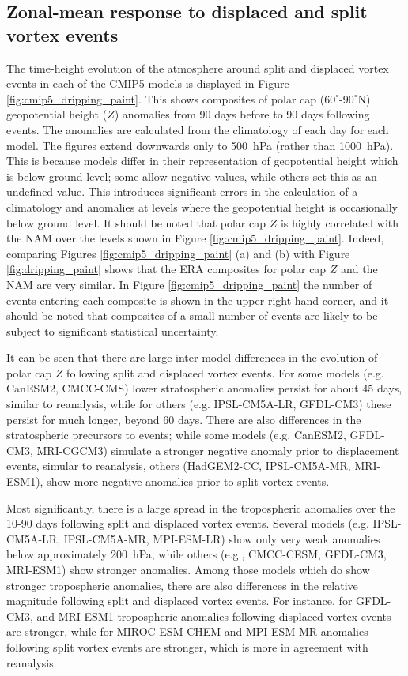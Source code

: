 \subsection{Zonal-mean response to displaced and split vortex events}

The time-height evolution of the atmosphere around split and displaced vortex
events in each of the CMIP5 models is displayed in Figure
\ref{fig:cmip5_dripping_paint}. This shows composites of polar cap
($60^{\circ}$-$90^{\circ}$N) geopotential height ($Z$) anomalies from 90 days
before to 90 days following events. The anomalies are calculated from the
climatology of each day for each model. The figures extend downwards only to
500~hPa (rather than 1000~hPa). This is because models differ in their
representation of geopotential height which is below ground level; some allow
negative values, while others set this as an undefined value. This introduces
significant errors in the calculation of a climatology and anomalies at levels
where the geopotential height is occasionally below ground level. It should be
noted that polar cap $Z$ is highly correlated with the NAM over the levels shown
in Figure \ref{fig:cmip5_dripping_paint}. Indeed, comparing Figures
\ref{fig:cmip5_dripping_paint} (a) and (b) with Figure \ref{fig:dripping_paint}
shows that the ERA composites for polar cap $Z$ and the NAM are very similar. In
Figure \ref{fig:cmip5_dripping_paint} the number of events entering each
composite is shown in the upper right-hand corner, and it should be noted that
composites of a small number of events are likely to be subject to significant
statistical uncertainty.

It can be seen that there are large inter-model differences in the evolution of
polar cap $Z$ following split and displaced vortex events. For some models
(e.g. CanESM2, CMCC-CMS) lower stratospheric anomalies persist for about 45
days, similar to reanalysis, while for others (e.g. IPSL-CM5A-LR, GFDL-CM3)
these persist for much longer, beyond 60 days. There are also differences in the
stratospheric precursors to events; while some models (e.g. CanESM2, GFDL-CM3,
MRI-CGCM3) simulate a stronger negative anomaly prior to displacement events,
simular to reanalysis, others (HadGEM2-CC, IPSL-CM5A-MR, MRI-ESM1), show more
negative anomalies prior to split vortex events. 

Most significantly, there is a large spread in the tropospheric anomalies over
the 10-90 days following split and displaced vortex events. Several models
(e.g. IPSL-CM5A-LR, IPSL-CM5A-MR, MPI-ESM-LR) show only very weak anomalies
below approximately 200~hPa, while others (e.g., CMCC-CESM, GFDL-CM3, MRI-ESM1)
show stronger anomalies. Among those models which do show stronger tropospheric
anomalies, there are also differences in the relative magnitude following split
and displaced vortex events. For instance, for GFDL-CM3, and MRI-ESM1
tropospheric anomalies following displaced vortex events are stronger, while for
MIROC-ESM-CHEM and MPI-ESM-MR anomalies following split vortex events are
stronger, which is more in agreement with reanalysis. 

